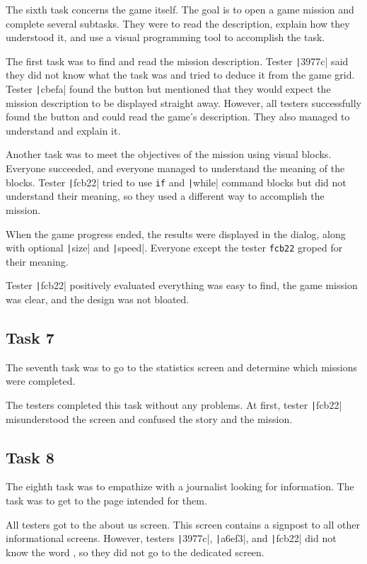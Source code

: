 The sixth task concerns the game itself.
The goal is to open a game mission and complete several subtasks.
They were to read the description, explain how they understood it, and use a visual programming tool to accomplish the task.

The first task was to find and read the mission description.
Tester \texttt|3977c| said they did not know what the task was and tried to deduce it from the game grid.
Tester \texttt|cbefa| found the button but mentioned that they would expect the mission description to be displayed straight away.
However, all testers successfully found the button and could read the game's description.
They also managed to understand and explain it.

Another task was to meet the objectives of the mission using visual blocks.
Everyone succeeded, and everyone managed to understand the meaning of the blocks.
Tester \texttt|fcb22| tried to use \mintinline {text}|if| and \texttt|while| command blocks but did not understand their meaning, so they used a different way to accomplish the mission.

When the game progress ended, the results were displayed in the dialog, along with optional \texttt|size| and \texttt|speed|.
Everyone except the tester \mintinline {text}|fcb22| groped for their meaning.

Tester \texttt|fcb22| positively evaluated everything was easy to find, the game mission was clear, and the design was not bloated.

\subsection*{Task 7}

The seventh task was to go to the statistics screen and determine which missions were completed.

The testers completed this task without any problems.
At first, tester \texttt|fcb22| misunderstood the screen and confused the story and the mission.

\subsection*{Task 8}

The eighth task was to empathize with a journalist looking for information.
The task was to get to the page intended for them.

All testers got to the about us screen.
This screen contains a signpost to all other informational screens.
However, testers \texttt|3977c|, \texttt|a6ef3|, and \texttt|fcb22| did not know the word , so they did not go to the dedicated screen.

